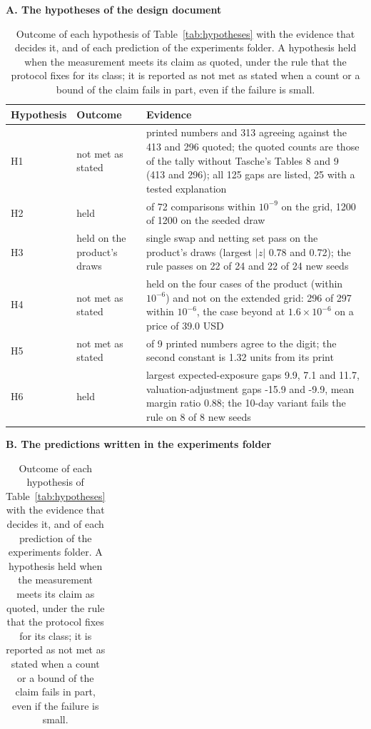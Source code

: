 \begin{table}[htbp]
\centering
\footnotesize
\setlength{\tabcolsep}{4pt}
\caption{Outcome of each hypothesis of Table~\ref{tab:hypotheses} with the evidence that decides it, and of each prediction of the experiments folder. A hypothesis held when the measurement meets its claim as quoted, under the rule that the protocol fixes for its class; it is reported as not met as stated when a count or a bound of the claim fails in part, even if the failure is small.}
\label{tab:outcomes}
\textbf{A. The hypotheses of the design document}\par\smallskip
\begin{tabularx}{\textwidth}{@{}l>{\raggedright\arraybackslash}p{3.2cm}>{\raggedright\arraybackslash}X@{}}
\toprule
Hypothesis & Outcome & Evidence \\
\midrule
H1 & not met as stated & \relax 438 printed numbers and 313 agreeing against the 413 and 296 quoted; the quoted counts are those of the tally without Tasche's Tables 8 and 9 (413 and 296); all 125 gaps are listed, 25 with a tested explanation \\
H2 & held & \relax 72 of 72 comparisons within $10^{-9}$ on the grid, 1200 of 1200 on the seeded draw \\
H3 & held on the product's draws & \relax single swap and netting set pass on the product's draws (largest $\lvert z\rvert$ 0.78 and 0.72); the rule passes on 22 of 24 and 22 of 24 new seeds \\
H4 & not met as stated & \relax held on the four cases of the product (within $10^{-6}$) and not on the extended grid: 296 of 297 within $10^{-6}$, the case beyond at $1.6\times10^{-6}$ on a price of 39.0 USD \\
H5 & not met as stated & \relax 8 of 9 printed numbers agree to the digit; the second constant is 1.32 units from its print \\
H6 & held & \relax largest expected-exposure gaps 9.9, 7.1 and 11.7, valuation-adjustment gaps -15.9 and -9.9, mean margin ratio 0.88; the 10-day variant fails the rule on 8 of 8 new seeds \\
\bottomrule
\end{tabularx}
\par\medskip
\textbf{B. The predictions written in the experiments folder}\par\smallskip
\begin{tabularx}{\textwidth}{@{}l>{\raggedright\arraybackslash}p{1.5cm}>{\raggedright\arraybackslash}X>{\raggedright\arraybackslash}p{4.4cm}@{}}

\end{tabularx}
\end{table}
